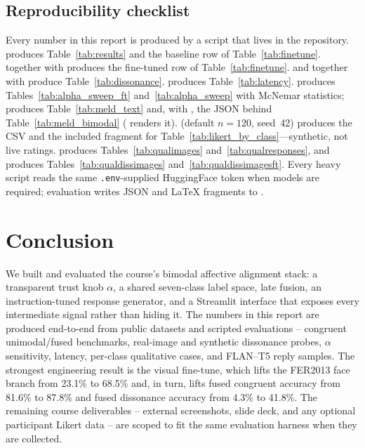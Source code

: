 \documentclass[sigconf,nonacm]{acmart}
\begin{document}
  \subsection{Reproducibility checklist}
  Every number in this report is produced by a script that lives in the repository.  produces Table~\ref{tab:results} and the baseline row of Table~\ref{tab:finetune}.  together with  produces the fine-tuned row of Table~\ref{tab:finetune}.  and  together with  produce Table~\ref{tab:dissonance}.  produces Table~\ref{tab:latency}.  produces Tables~\ref{tab:alpha_sweep_ft} and~\ref{tab:alpha_sweep} with McNemar statistics;  produces Table~\ref{tab:meld_text} and, with , the JSON behind Table~\ref{tab:meld_bimodal} ( renders it).  (default $n\!=\!120$, seed~42) produces the CSV and the included fragment for Table~\ref{tab:likert_by_class}---synthetic, not live ratings.  produces Tables~\ref{tab:qualimages} and~\ref{tab:qualresponses}, and  produces Tables~\ref{tab:qualdissimages} and~\ref{tab:qualdissimagesft}. Every heavy script reads the same \texttt{.env}-supplied HuggingFace token when models are required; evaluation writes JSON and LaTeX fragments to .

  \section{Conclusion}
  We built and evaluated the course's bimodal affective alignment stack: a transparent trust knob $\alpha$, a shared seven-class label space, late fusion, an instruction-tuned response generator, and a Streamlit interface that exposes every intermediate signal rather than hiding it. The numbers in this report are produced end-to-end from public datasets and scripted evaluations -- congruent unimodal/fused benchmarks, real-image and synthetic dissonance probes, $\alpha$ sensitivity, latency, per-class qualitative cases, and FLAN--T5 reply samples. The strongest engineering result is the visual fine-tune, which lifts the FER2013 face branch from 23.1\% to 68.5\% and, in turn, lifts fused congruent accuracy from 81.6\% to 87.8\% and fused dissonance accuracy from 4.3\% to 41.8\%. The remaining course deliverables -- external screenshots, slide deck, and any optional participant Likert data -- are scoped to fit the same evaluation harness when they are collected.
\end{document}
